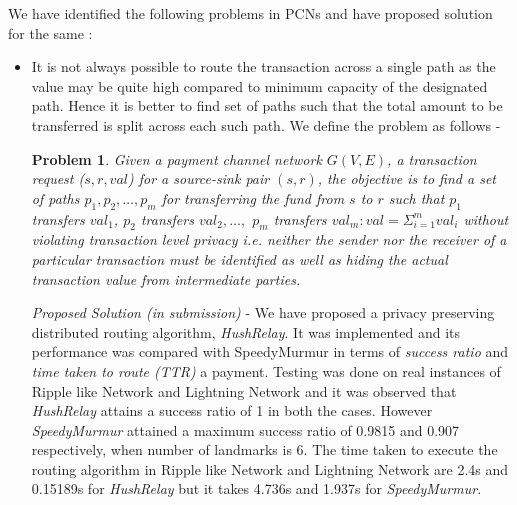 \documentclass[10pt]{article}
\newtheorem{problem}{\textbf{Problem}}
\begin{document}
We have identified the following problems in PCNs and have proposed solution for the same :
\begin{itemize}
\item It is not always possible to route the transaction across a single path as the value may be quite high compared to minimum capacity of the designated path. Hence it is better to find set of paths such that the total amount to be transferred is split across each such path. We define the problem as follows -
\begin{problem}
\textit{Given a payment channel network $G(V,E)$, a transaction request ($s,r,val$) for a source-sink pair $(s,r)$, the objective is to find a set of paths $p_1,p_2,\ldots,p_m$ for transferring the fund from $s$ to $r$ such that $p_1$ transfers $val_1$, $p_2$ transfers $val_2,\ldots,$ $p_m$ transfers $val_m : val=\Sigma_{i=1}^m val_i$ without violating \textit{transaction level privacy} i.e. neither the sender nor the receiver of a particular transaction must be identified as well as hiding the actual transaction value from intermediate parties.}
\end{problem}
 \emph{Proposed Solution (in submission)} - We have proposed a privacy preserving distributed routing algorithm, \textit{HushRelay}. It was implemented  and its performance was compared with SpeedyMurmur \cite{speedymurmur} in terms of \textit{success ratio} and \textit{time taken to route (TTR)} a payment. Testing was done on real instances of Ripple like Network and Lightning Network and it was observed that \emph{HushRelay} attains a success ratio of 1 in both the cases. However \emph{SpeedyMurmur} attained a maximum success ratio of 0.9815 and 0.907 respectively, when number of landmarks is 6. The time taken to execute the routing algorithm in Ripple like Network and Lightning Network are 2.4s and 0.15189s for \emph{HushRelay} but it takes 4.736s and 1.937s for \emph{SpeedyMurmur}.


\end{itemize}
\end{document}
